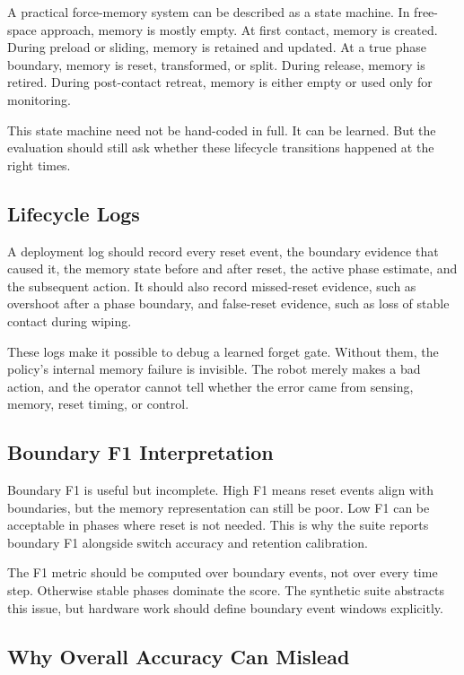 \documentclass{article}
\begin{document}
A practical force-memory system can be described as a state machine. In
free-space approach, memory is mostly empty. At first contact, memory is
created. During preload or sliding, memory is retained and updated. At a true
phase boundary, memory is reset, transformed, or split. During release, memory
is retired. During post-contact retreat, memory is either empty or used only for
monitoring.

This state machine need not be hand-coded in full. It can be learned. But the
evaluation should still ask whether these lifecycle transitions happened at the
right times.

\subsection{Lifecycle Logs}

A deployment log should record every reset event, the boundary evidence that
caused it, the memory state before and after reset, the active phase estimate,
and the subsequent action. It should also record missed-reset evidence, such as
overshoot after a phase boundary, and false-reset evidence, such as loss of
stable contact during wiping.

These logs make it possible to debug a learned forget gate. Without them, the
policy's internal memory failure is invisible. The robot merely makes a bad
action, and the operator cannot tell whether the error came from sensing,
memory, reset timing, or control.

\subsection{Boundary F1 Interpretation}

Boundary F1 is useful but incomplete. High F1 means reset events align with
boundaries, but the memory representation can still be poor. Low F1 can be
acceptable in phases where reset is not needed. This is why the suite reports
boundary F1 alongside switch accuracy and retention calibration.

The F1 metric should be computed over boundary events, not over every time
step. Otherwise stable phases dominate the score. The synthetic suite abstracts
this issue, but hardware work should define boundary event windows explicitly.

\subsection{Why Overall Accuracy Can Mislead}
\end{document}
